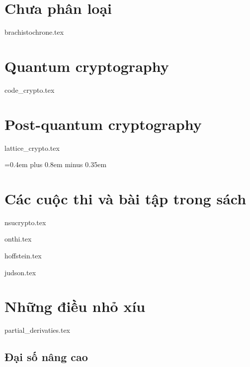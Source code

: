\documentclass{mynotes}
\begin{document}
\part{Chưa phân loại}





{brachistochrone.tex}



\part{Quantum cryptography}

\parttoc



{code_crypto.tex}

\part{Post-quantum cryptography}

\parttoc

{lattice_crypto.tex}

{
 \spaceskip=0.4em plus 0.8em minus 0.35em
\printbibliography[env=gostbibliography,heading=bibintoc,title={Tài liệu tham khảo}]
}


\part{Các cuộc thi và bài tập trong sách}

\parttoc

{nsucrypto.tex}

{onthi.tex}

{hoffstein.tex}

{judson.tex}

\part{Những điều nhỏ xíu}

\parttoc

{partial_derivaties.tex}

\chapter{Đại số nâng cao}
\end{document}
